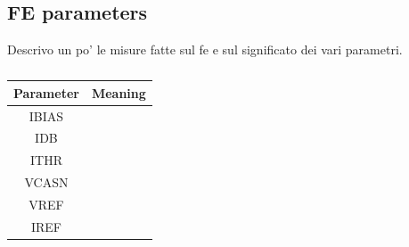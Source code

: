     \subsection{FE parameters}
    Descrivo un po' le misure fatte sul fe e sul significato dei vari parametri.\\
    \begin{table}
        \begin{center}
        \begin{tabular}{|c | c |}
        \hline
        Parameter & Meaning\\
        \hline
        \hline
        IBIAS\\
        IDB\\
        ITHR \\
        VCASN\\
        VREF\\
        IREF\\
        \hline
        \end{tabular}
        \caption{}
        \label{tab:FE-parameters}
        \end{center}
     \end{table}
    
